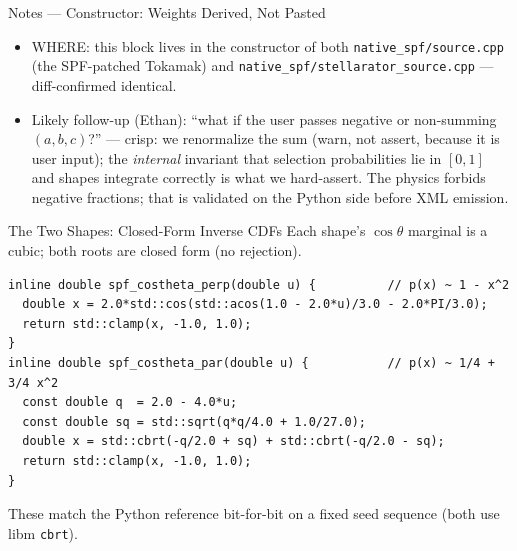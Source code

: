 \documentclass[11pt,aspectratio=169]{beamer}
\begin{document}
\begin{frame}[allowframebreaks]{Notes --- Constructor: Weights Derived, Not Pasted}
{\begin{itemize}
      is set once in the constructor and is \texttt{const} at \texttt{sample()} time. No mutable
      state, so no data race under OpenMP; each thread owns its own \texttt{seed}
      (QA\_RESEARCH Q9).
\item WHERE: this block lives in the constructor of both \texttt{native\_spf/source.cpp} (the
      SPF-patched Tokamak) and \texttt{native\_spf/stellarator\_source.cpp} --- diff-confirmed
      identical.
\item Likely follow-up (Ethan): ``what if the user passes negative or non-summing $(a,b,c)$?'' ---
      crisp: we renormalize the sum (warn, not assert, because it is user input); the \emph{internal}
      invariant that selection probabilities lie in $[0,1]$ and shapes integrate correctly is what we
      hard-assert. The physics forbids negative fractions; that is validated on the Python side
      before XML emission.
\end{itemize}
}
\end{frame}

\begin{frame}[fragile]{The Two Shapes: Closed-Form Inverse CDFs}
Each shape's $\cos\theta$ marginal is a cubic; both roots are closed form (no rejection).
\begin{verbatim}
inline double spf_costheta_perp(double u) {          // p(x) ~ 1 - x^2
  double x = 2.0*std::cos(std::acos(1.0 - 2.0*u)/3.0 - 2.0*PI/3.0);
  return std::clamp(x, -1.0, 1.0);
}
inline double spf_costheta_par(double u) {           // p(x) ~ 1/4 + 3/4 x^2
  const double q  = 2.0 - 4.0*u;
  const double sq = std::sqrt(q*q/4.0 + 1.0/27.0);
  double x = std::cbrt(-q/2.0 + sq) + std::cbrt(-q/2.0 - sq);
  return std::clamp(x, -1.0, 1.0);
}
\end{verbatim}
\footnotesize These match the Python reference bit-for-bit on a fixed seed sequence
(both use libm \texttt{cbrt}).
\end{frame}
\end{document}
